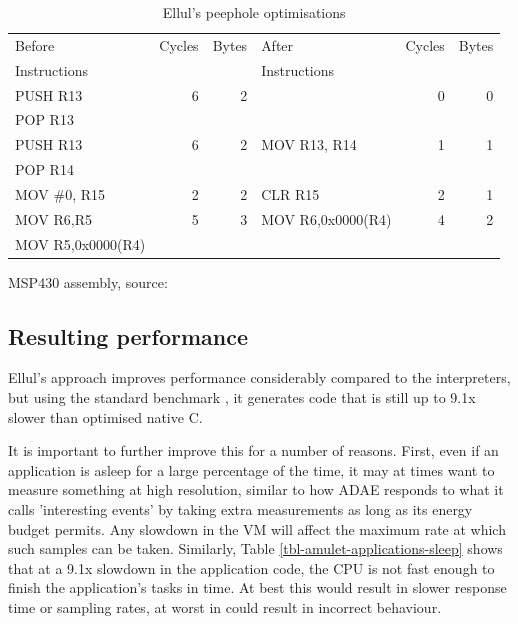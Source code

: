 \begin{table}
\caption{Ellul's peephole optimisations}
\label{tbl-ellul-peephole}
    \begin{threeparttable}
    \begin{tabular}{lrrlrr} %
    \toprule
    Before            & Cycles & Bytes  & After             & Cycles & Bytes \\
    Instructions      &        &        & Instructions      &        & \\
    \midrule
    \midrule
    PUSH R13          & 6      & 2      &                   & 0      & 0 \\
    POP R13           &        &        &                   &        & \\
    \midrule
    PUSH R13          & 6      & 2      & MOV R13, R14      & 1      & 1 \\
    POP R14           &        &        &                   &        & \\
    \midrule
    MOV \#0, R15      & 2      & 2      & CLR R15           & 2      & 1 \\
    \midrule
    MOV R6,R5         & 5      & 3      & MOV R6,0x0000(R4) & 4      & 2 \\
    MOV R5,0x0000(R4) &        &        &                   &        & \\
    \bottomrule
    \end{tabular}
    \begin{tablenotes}
    \item MSP430 assembly, source: \cite{Ellul:2012thesis}
    \end{tablenotes}
    \end{threeparttable}
\end{table}

\subsection{Resulting performance}
Ellul's approach improves performance considerably compared to the interpreters, but using the standard  benchmark \cite{coremark}, it generates code that is still up to 9.1x slower than optimised native C.

It is important to further improve this for a number of reasons. First, even if an application is asleep for a large percentage of the time, it may at times want to measure something at high resolution, similar to how ADAE \cite{Chang:2010ek} responds to what it calls 'interesting events' by taking extra measurements as long as its energy budget permits. Any slowdown in the VM will affect the maximum rate at which such samples can be taken. Similarly, Table \ref{tbl-amulet-applications-sleep} shows that at a 9.1x slowdown in the application code, the CPU is not fast enough to finish the application's tasks in time. At best this would result in slower response time or sampling rates, at worst in could result in incorrect behaviour.

